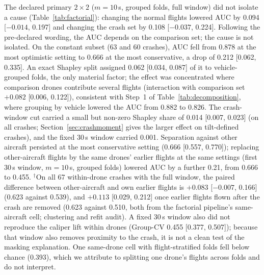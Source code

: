 \documentclass[preprint,12pt]{elsarticle}
\begin{document}
The declared primary $2\times2$ ($m=10$\,s, grouped folds, full window) did not isolate a cause (Table~\ref{tab:factorial}): changing the normal flights lowered AUC by 0.094 [$-0.014$, 0.197] and changing the crash set by 0.108 [$-0.037$, 0.224]. Following the pre-declared wording, the AUC depends on the comparison set; the cause is not isolated. On the constant subset (63 and 60 crashes), AUC fell from 0.878 at the most optimistic setting to 0.666 at the most conservative, a drop of 0.212 [0.062, 0.335]. An exact Shapley split assigned 0.062 [0.034, 0.087] of it to vehicle-grouped folds, the only material factor; the effect was concentrated where comparison drones contribute several flights (interaction with comparison set $+0.082$ [0.006, 0.122]), consistent with Step~1 of Table~\ref{tab:decomposition}, where grouping by vehicle lowered the AUC from 0.882 to 0.826. The crash-window cut carried a small but non-zero Shapley share of 0.014 [0.007, 0.023] (on all crashes; Section~\ref{sec:crashmoment} gives the larger effect on tilt-defined crashes), and the fixed 30\,s window carried 0.001. Separation against other aircraft persisted at the most conservative setting (0.666 [0.557, 0.770]); replacing other-aircraft flights by the same drones' earlier flights at the same settings (first 30\,s window, $m=10$\,s, grouped folds) lowered AUC by a further 0.21, from 0.666 to 0.455. $^\dagger$On all 67 within-drone crashes with the full window, the paired difference between other-aircraft and own earlier flights is $+0.083$ [$-0.007$, 0.166] (0.623 against 0.539), and $+0.113$ [0.029, 0.212] once earlier flights flown after the crash are removed (0.623 against 0.510, both from the factorial pipeline's same-aircraft cell; clustering and refit audit). A fixed 30\,s window also did not reproduce the caliper lift within drones (Group-CV 0.455 [0.377, 0.507]); because that window also removes proximity to the crash, it is not a clean test of the masking explanation. One same-drone cell with flight-stratified folds fell below chance (0.393), which we attribute to splitting one drone's flights across folds and do not interpret.
\end{document}
